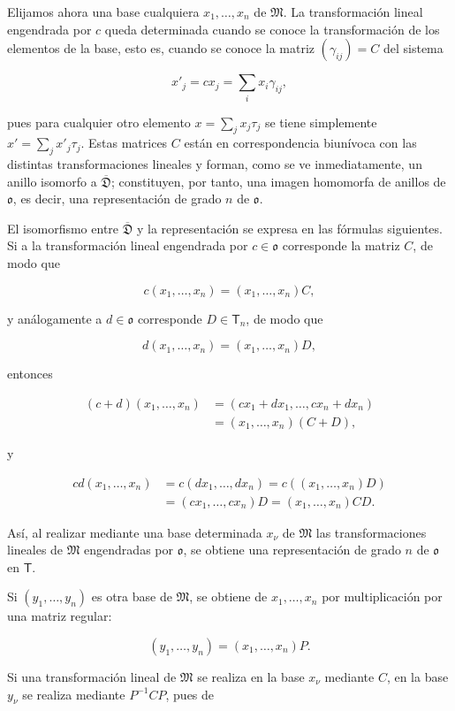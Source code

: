 Elijamos ahora una base cualquiera $x_1,\ldots,x_n$ de $\mathfrak M$. La transformación lineal engendrada por $c$ queda determinada cuando se conoce la transformación de los elementos de la base, esto es, cuando se conoce la matriz $(\gamma_{ij})=C$ del sistema

\[
x'_j=cx_j=\sum_i x_i\gamma_{ij},
\]

pues para cualquier otro elemento $x=\sum_jx_j\tau_j$ se tiene simplemente $x'=\sum_jx'_j\tau_j$. Estas matrices $C$ están en correspondencia biunívoca con las distintas transformaciones lineales y forman, como se ve inmediatamente, un anillo isomorfo a $\overline{\mathfrak D}$; constituyen, por tanto, una imagen homomorfa de anillos de $\mathfrak{o}$, es decir, una representación de grado $n$ de $\mathfrak{o}$.

El isomorfismo entre $\overline{\mathfrak D}$ y la representación se expresa en las fórmulas siguientes. Si a la transformación lineal engendrada por $c\in\mathfrak{o}$ corresponde la matriz $C$, de modo que

\[
c(x_1,\ldots,x_n)=(x_1,\ldots,x_n)C,
\]

y análogamente a $d\in\mathfrak{o}$ corresponde $D\in\mathsf T_n$, de modo que

\[
d(x_1,\ldots,x_n)=(x_1,\ldots,x_n)D,
\]

entonces

\[
\begin{aligned}
(c+d)(x_1,\ldots,x_n)
&=(cx_1+dx_1,\ldots,cx_n+dx_n)\\
&=(x_1,\ldots,x_n)(C+D),
\end{aligned}
\]

y

\[
\begin{aligned}
cd(x_1,\ldots,x_n)
&=c(dx_1,\ldots,dx_n)=c((x_1,\ldots,x_n)D)\\
&=(cx_1,\ldots,cx_n)D=(x_1,\ldots,x_n)CD.
\end{aligned}
\]

Así, al realizar mediante una base determinada $x_\nu$ de $\mathfrak M$ las transformaciones lineales de $\mathfrak M$ engendradas por $\mathfrak{o}$, se obtiene una representación de grado $n$ de $\mathfrak{o}$ en $\mathsf T$.

Si $(y_1,\ldots,y_n)$ es otra base de $\mathfrak M$, se obtiene de $x_1,\ldots,x_n$ por multiplicación por una matriz regular:

\[
(y_1,\ldots,y_n)=(x_1,\ldots,x_n)P.
\]

Si una transformación lineal de $\mathfrak M$ se realiza en la base $x_\nu$ mediante $C$, en la base $y_\nu$ se realiza mediante $P^{-1}CP$, pues de

